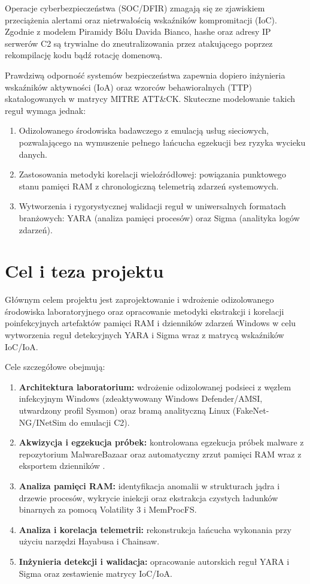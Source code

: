 Operacje cyberbezpieczeństwa (SOC/DFIR) zmagają się ze zjawiskiem przeciążenia alertami oraz nietrwałością wskaźników kompromitacji (IoC). Zgodnie z modelem Piramidy Bólu Davida Bianco, hashe oraz adresy IP serwerów C2 są trywialne do zneutralizowania przez atakującego poprzez rekompilację kodu bądź rotację domenową.

Prawdziwą odporność systemów bezpieczeństwa zapewnia dopiero inżynieria wskaźników aktywności (IoA) oraz wzorców behawioralnych (TTP) skatalogowanych w matrycy MITRE ATT\&CK. Skuteczne modelowanie takich reguł wymaga jednak:
\begin{enumerate}
    \item Odizolowanego środowiska badawczego z emulacją usług sieciowych, pozwalającego na wymuszenie pełnego łańcucha egzekucji bez ryzyka wycieku danych.
    \item Zastosowania metodyki korelacji wieloźródłowej: powiązania punktowego stanu pamięci RAM z chronologiczną telemetrią zdarzeń systemowych.
    \item Wytworzenia i rygorystycznej walidacji reguł w uniwersalnych formatach branżowych: YARA (analiza pamięci procesów) oraz Sigma (analityka logów zdarzeń).
\end{enumerate}

\section{Cel i teza projektu}\label{sec:cele_projektu}

Głównym celem projektu jest zaprojektowanie i wdrożenie odizolowanego środowiska laboratoryjnego oraz opracowanie metodyki ekstrakcji i korelacji poinfekcyjnych artefaktów pamięci RAM i dzienników zdarzeń Windows w celu wytworzenia reguł detekcyjnych YARA i Sigma wraz z matrycą wskaźników IoC/IoA.

Cele szczegółowe obejmują:
\begin{enumerate}
    \item \textbf{Architektura laboratorium:} wdrożenie odizolowanej podsieci z węzłem infekcyjnym Windows (zdeaktywowany Windows Defender/AMSI, utwardzony profil Sysmon) oraz bramą analityczną Linux (FakeNet-NG/INetSim do emulacji C2).
    \item \textbf{Akwizycja i egzekucja próbek:} kontrolowana egzekucja próbek malware z repozytorium MalwareBazaar oraz automatyczny zrzut pamięci RAM wraz z eksportem dzienników .
    \item \textbf{Analiza pamięci RAM:} identyfikacja anomalii w strukturach jądra i drzewie procesów, wykrycie iniekcji oraz ekstrakcja czystych ładunków binarnych za pomocą Volatility 3 i MemProcFS.
    \item \textbf{Analiza i korelacja telemetrii:} rekonstrukcja łańcucha wykonania przy użyciu narzędzi Hayabusa i Chainsaw.
    \item \textbf{Inżynieria detekcji i walidacja:} opracowanie autorskich reguł YARA i Sigma oraz zestawienie matrycy IoC/IoA.
\end{enumerate}


